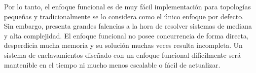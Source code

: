     Por lo tanto, el enfoque funcional es de muy fácil implementación para topologías pequeñas y tradicionalmente se lo considera como el único enfoque por defecto. Sin embargo, presenta grandes falencias a la hora de resolver sistemas de mediana y alta complejidad. El enfoque funcional no posee concurrencia de forma directa, desperdicia mucha memoria y su solución muchas veces resulta incompleta. Un sistema de enclavamientos diseñado con un enfoque funcional difícilmente será mantenible en el tiempo ni mucho menos escalable o fácil de actualizar.
